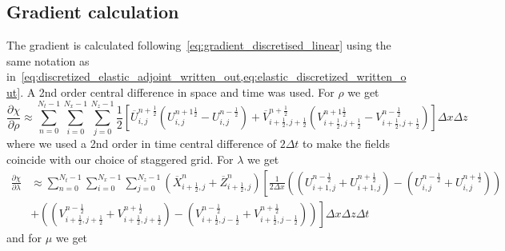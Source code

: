 \documentclass[10pt]{SelfArx} %
\newcommand{\pder}[2][]{\frac{\partial#1}{\partial#2}}
\theoremstyle{definition}
\begin{document}
\subsection{Gradient calculation}
The gradient is calculated following~\cref{eq:gradient_discretised_linear} using the same notation as in~\cref{eq:discretized_elastic_adjoint_written_out,eq:elastic_discretized_written_out}. A 2nd order central difference in space and time was used. For $\rho$ we get 
\begin{equation}\label{eq:discrete_gradient_rho_written_out}
\pder[\chi]{\rho} \approx \sum_{n=0}^{N_t-1}\sum_{i=0}^{N_x-1}\sum_{j=0}^{N_z-1} \frac{1}{2}\left[\overline{U}^{n+\frac{1}{2}}_{i,j}\left(U_{i,j}^{n+1\frac{1}{2}} - U^{n-\frac{1}{2}}_{i,j}\right) + \overline{V}^{n+\frac{1}{2}}_{i+\frac{1}{2},j+\frac{1}{2}}\left(V_{i+\frac{1}{2},j+\frac{1}{2}}^{n+1\frac{1}{2}} - V^{n-\frac{1}{2}}_{i+\frac{1}{2},j+\frac{1}{2}}\right)\right]\Delta x \Delta z
\end{equation}
where we used a 2nd order in time central difference of $2\Delta t$ to make the fields coincide with our choice of staggered grid. For $\lambda$ we get
\begin{equation}\label{eq:discrete_gradient_lambda_written_out}
\begin{aligned}
\pder[\chi]{\lambda} &\approx \sum_{n=0}^{N_t-1}\sum_{i=0}^{N_x-1}\sum_{j=0}^{N_z-1} \left(\overline{X}^n_{i+\frac{1}{2}, j} + \overline{Z}^n_{i+\frac{1}{2}, j}\right) \left[\frac{1}{2\Delta x}\left(\left(U^{n-\frac{1}{2}}_{i+1,j} + U^{n+\frac{1}{2}}_{i+1,j}\right) - \left(U^{n-\frac{1}{2}}_{i,j} + U^{n+\frac{1}{2}}_{i,j}\right)\right) \right. \\
&+\left. \left(\left(V^{n-\frac{1}{2}}_{i+\frac{1}{2},j+\frac{1}{2}} + V^{n+\frac{1}{2}}_{i+\frac{1}{2},j+\frac{1}{2}}\right) - \left(V^{n-\frac{1}{2}}_{i+\frac{1}{2},j-\frac{1}{2}} + V^{n+\frac{1}{2}}_{i+\frac{1}{2},j-\frac{1}{2}}\right)\right)   \right]\Delta x \Delta z \Delta t
\end{aligned}
\end{equation}
and for $\mu$ we get
\end{document}
